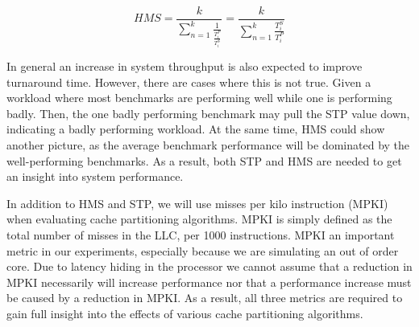 \begin{equation} \label{eq:HMS}
 {HMS} = \frac{k}{{\sum\limits_{n=1}^{k}\frac{1}{\frac{T^{P}_i}{T^{S}_i}}}} = \frac{k}{{\sum\limits_{n=1}^{k}\frac{T^{S}_i}{T^{P}_i}}}
\end{equation}

In general an increase in system throughput is also expected to improve turnaround time.
However, there are cases where this is not true.
Given a workload where most benchmarks are performing well while one is performing badly.
Then, the one badly performing benchmark may pull the STP value down, indicating a badly performing workload.
At the same time, HMS could show another picture, as the average benchmark performance will be dominated by the well-performing benchmarks.
As a result, both STP and HMS are needed to get an insight into system performance.

In addition to HMS and STP, we will use misses per kilo instruction (MPKI) when evaluating cache partitioning algorithms.
MPKI is simply defined as the total number of misses in the LLC, per 1000 instructions.
MPKI an important metric in our experiments, especially because we are simulating an out of order core. 
Due to latency hiding in the processor we cannot assume that a reduction in MPKI necessarily will increase performance nor that a performance increase must be caused by a reduction in MPKI.
As a result, all three metrics are required to gain full insight into the effects of various cache partitioning algorithms.